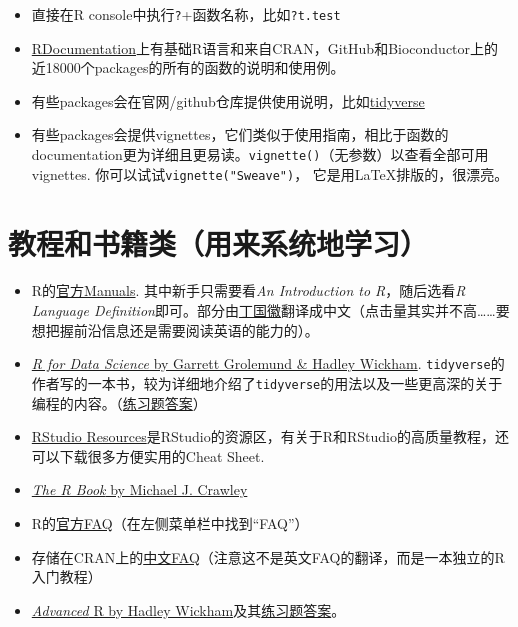 \documentclass[]{book}
\providecommand{\tightlist}{%
  \setlength{\itemsep}{0pt}\setlength{\parskip}{0pt}}
\begin{document}
\begin{itemize}
\tightlist
\item
  直接在R console中执行\texttt{?}+函数名称，比如\texttt{?t.test}
\item
  \href{https://www.rdocumentation.org}{RDocumentation}上有基础R语言和来自CRAN，GitHub和Bioconductor上的近18000个packages的所有的函数的说明和使用例。
\item
  有些packages会在官网/github仓库提供使用说明，比如\href{https://www.tidyverse.org}{tidyverse}
\item
  有些packages会提供vignettes，它们类似于使用指南，相比于函数的documentation更为详细且更易读。\texttt{vignette()}（无参数）以查看全部可用vignettes. 你可以试试\texttt{vignette("Sweave")}， 它是用LaTeX排版的，很漂亮。
\end{itemize}

\section{教程和书籍类（用来系统地学习）}

\begin{itemize}
\tightlist
\item
  R的\href{https://cran.r-project.org/manuals.html}{官方Manuals}.
  其中新手只需要看\emph{An Introduction to R}，随后选看\emph{R Language Definition}即可。部分由\href{https://github.com/dingguohui}{丁国徽}翻译成中文（点击量其实并不高\ldots{}\ldots{}要想把握前沿信息还是需要阅读英语的能力的）。
\item
  \href{https://r4ds.had.co.nz}{\emph{R for Data Science} by Garrett Grolemund \& Hadley Wickham}. \texttt{tidyverse}的作者写的一本书，较为详细地介绍了\texttt{tidyverse}的用法以及一些更高深的关于编程的内容。（\href{https://jrnold.github.io/r4ds-exercise-solutions/}{练习题答案}）
\item
  \href{https://resources.rstudio.com}{RStudio Resources}是RStudio的资源区，有关于R和RStudio的高质量教程，还可以下载很多方便实用的Cheat Sheet.
\item
  \href{https://github.com/TianyiShi2001/R-Tutorial-Resorces/blob/master/资源/书籍/TheRBook.pdf}{\emph{The R Book} by Michael J. Crawley}
\item
  R的\href{https://cran.r-project.org}{官方FAQ}（在左侧菜单栏中找到``FAQ''）
\item
  存储在CRAN上的\href{https://cran.r-project.org/doc/contrib/Liu-FAQ.pdf}{中文FAQ}（注意这不是英文FAQ的翻译，而是一本独立的R入门教程）
\item
  \href{https://adv-r.hadley.nz/index.html}{\emph{Advanced} R by Hadley Wickham}及其\href{https://advanced-r-solutions.rbind.io}{练习题答案}。
\end{itemize}
\end{document}
